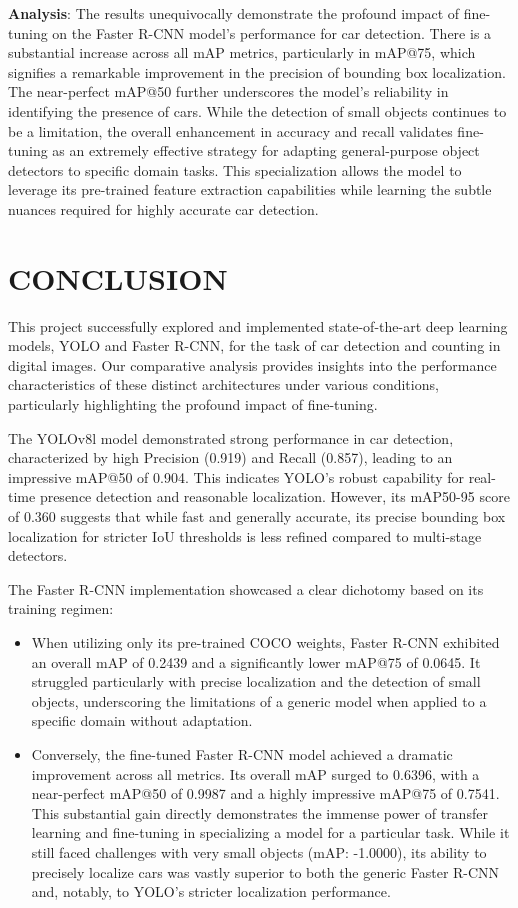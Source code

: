 \documentclass[conference]{IEEEtran}
\begin{document}
\textbf{Analysis}: The results unequivocally demonstrate the profound impact of fine-tuning on the Faster R-CNN model's performance for car detection. There is a substantial increase across all mAP metrics, particularly in mAP@75, which signifies a remarkable improvement in the precision of bounding box localization. The near-perfect mAP@50 further underscores the model's reliability in identifying the presence of cars. While the detection of small objects continues to be a limitation, the overall enhancement in accuracy and recall validates fine-tuning as an extremely effective strategy for adapting general-purpose object detectors to specific domain tasks. This specialization allows the model to leverage its pre-trained feature extraction capabilities while learning the subtle nuances required for highly accurate car detection.

\section{\uppercase{Conclusion}} 
\label{sec:conclusion}

This project successfully explored and implemented state-of-the-art deep learning models, YOLO and Faster R-CNN, for the task of car detection and counting in digital images. Our comparative analysis provides insights into the performance characteristics of these distinct architectures under various conditions, particularly highlighting the profound impact of fine-tuning.

The YOLOv8l model demonstrated strong performance in car detection, characterized by high Precision (0.919) and Recall (0.857), leading to an impressive mAP@50 of 0.904. This indicates YOLO's robust capability for real-time presence detection and reasonable localization. However, its mAP50-95 score of 0.360 suggests that while fast and generally accurate, its precise bounding box localization for stricter IoU thresholds is less refined compared to multi-stage detectors.

The Faster R-CNN implementation showcased a clear dichotomy based on its training regimen:
\begin{itemize}
    \item When utilizing only its pre-trained COCO weights, Faster R-CNN exhibited an overall mAP of 0.2439 and a significantly lower mAP@75 of 0.0645. It struggled particularly with precise localization and the detection of small objects, underscoring the limitations of a generic model when applied to a specific domain without adaptation.
    \item Conversely, the fine-tuned Faster R-CNN model achieved a dramatic improvement across all metrics. Its overall mAP surged to 0.6396, with a near-perfect mAP@50 of 0.9987 and a highly impressive mAP@75 of 0.7541. This substantial gain directly demonstrates the immense power of transfer learning and fine-tuning in specializing a model for a particular task. While it still faced challenges with very small objects (mAP: -1.0000), its ability to precisely localize cars was vastly superior to both the generic Faster R-CNN and, notably, to YOLO's stricter localization performance.
\end{itemize}
\end{document}
